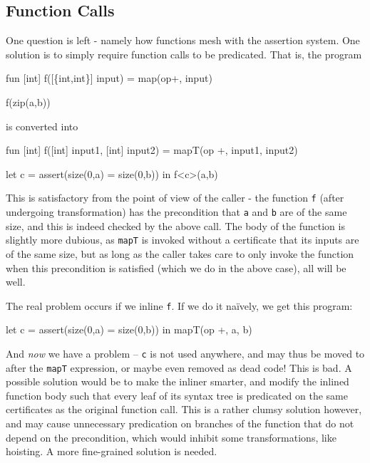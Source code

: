\subsection{Function Calls}

One question is left - namely how functions mesh with the assertion
system.  One solution is to simply require function calls to be
predicated.  That is, the program
\begin{colorcode}
fun [int] f([\{int,int\}] input) =
  map(op+, input)

f(zip(a,b))
\end{colorcode}
is converted into
\begin{colorcode}
fun [int] f([int] input1, [int] input2) =
  mapT(op +, input1, input2)

let c = assert(size(0,a) = size(0,b)) in
f<c>(a,b)
\end{colorcode}

This is satisfactory from the point of view of the caller - the
function \texttt{f} (after undergoing transformation) has the
precondition that \texttt{a} and \texttt{b} are of the same size, and
this is indeed checked by the above call.  The body of the function is
slightly more dubious, as \texttt{mapT} is invoked without a
certificate that its inputs are of the same size, but as long as the
caller takes care to only invoke the function when this precondition
is satisfied (which we do in the above case), all will be well.

The real problem occurs if we inline \texttt{f}.  If we do it naïvely,
we get this program:
\begin{colorcode}
let c = assert(size(0,a) = size(0,b)) in
mapT(op +, a, b)
\end{colorcode}
And \textit{now} we have a problem -- \texttt{c} is not used anywhere,
and may thus be moved to after the \texttt{mapT} expression, or maybe
even removed as dead code!  This is bad.  A possible solution would be
to make the inliner smarter, and modify the inlined function body such
that every leaf of its syntax tree is predicated on the same
certificates as the original function call.  This is a rather clumsy
solution however, and may cause unnecessary predication on branches of
the function that do not depend on the precondition, which would
inhibit some transformations, like hoisting.  A more fine-grained
solution is needed.


